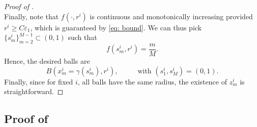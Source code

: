 \documentclass[a4paper,11pt]{article}
\theoremstyle{plain}
\renewcommand{\geq}{\geqslant}
\numberwithin{equation}{section}
\begin{document}
\begin{proof}[Proof of ]
\begin{equation*}
    \end{equation*}
    Finally, note that $f(\cdot,r^i)$ is continuous and monotonically increasing provided $r^i\geq C\varepsilon_1$, which is guaranteed by \eqref{eq: bound}. We can thus pick $\{s_m^i\}_{m=2}^{M-1}\subset(0,1)$ such that
    \begin{equation*}
        f(s_m^i,r^i)=\frac{m}{M}.
    \end{equation*}
    Hence, the desired balls are
    \begin{equation*}
        B\left(x_m^i=\gamma(s_m^i),r^i\right),\hspace{1cm} \text{ with } (s_1^i, s_M^i)=(0, 1).
    \end{equation*}
    Finally, since for fixed $i$, all balls have the same radius, the existence of $z_m^i$ is straightforward.
    \end{proof}

\subsection{\texorpdfstring{Proof of }{Proof of Theorem}}
\end{document}
